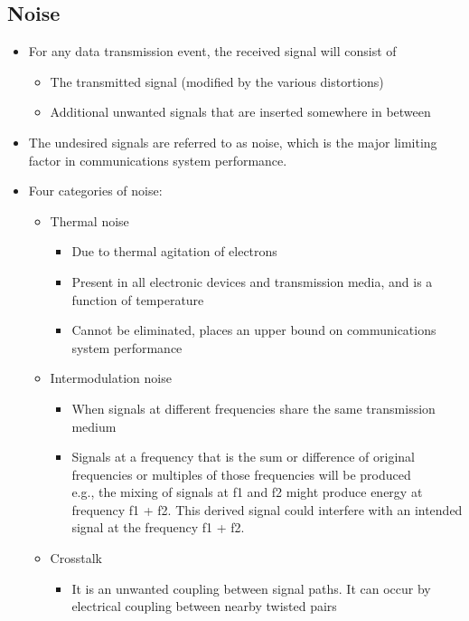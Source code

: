 \documentclass[11pt]{article}
\begin{document}
\subsection{Noise}
\begin{itemize}
    \item For any data transmission event, the received signal will consist of
    \begin{itemize}
        \item The transmitted signal (modified by the various distortions)
        \item Additional unwanted signals that are inserted somewhere in between
    \end{itemize}
    \item The undesired signals are referred to as noise, which is the major limiting factor in communications system performance.
    \item Four categories of noise:
    \begin{itemize}
        \item Thermal noise
        \begin{itemize}
            \item Due to thermal agitation of electrons
            \item Present in all electronic devices and transmission media, and is a function of temperature
            \item Cannot be eliminated, places an upper bound on communications system performance
        \end{itemize}
        \item Intermodulation noise
        \begin{itemize}
            \item When signals at different frequencies share the same transmission medium
            \item Signals at a frequency that is the sum or difference of original frequencies or multiples of those frequencies will be produced \\
            e.g., the mixing of signals at f1 and f2 might produce energy at frequency f1 + f2. This derived signal could interfere with an intended signal at the frequency f1 + f2.
        \end{itemize}
        \item Crosstalk
        \begin{itemize}
            \item It is an unwanted coupling between signal paths. It can occur by electrical coupling between nearby twisted pairs

\end{itemize}
\end{itemize}
\end{itemize}
\end{document}
